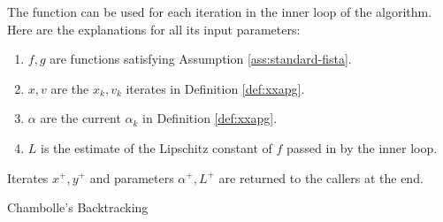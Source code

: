 \documentclass[12pt]{report}
\begin{document}
            The function can be used for each iteration in the inner loop of the algorithm. 
            Here are the explanations for all its input parameters: 
            \begin{enumerate}
                \item $f, g$ are functions satisfying Assumption \ref{ass:standard-fista}. 
                \item $x, v$ are the $x_k, v_k$ iterates in Definition \ref{def:xxapg}. 
                \item $\alpha$ are the current $\alpha_k$ in Definition \ref{def:xxapg}. 
                \item $L$ is the estimate of the Lipschitz constant of $f$ passed in by the inner loop. 
            \end{enumerate}
            Iterates $x^+, y^+$ and parameters $\alpha^+, L^+$ are returned to the callers at the end. 
            \begin{algorithm}[H]
                {\small
                \begin{algorithmic}[1]
                        \ENDIF
                    \ENDFOR
                    \caption{Chambolle's Backtracking}\label{alg:chambolle-btls}
                \end{algorithmic}
                }
            \end{algorithm}
\end{document}
